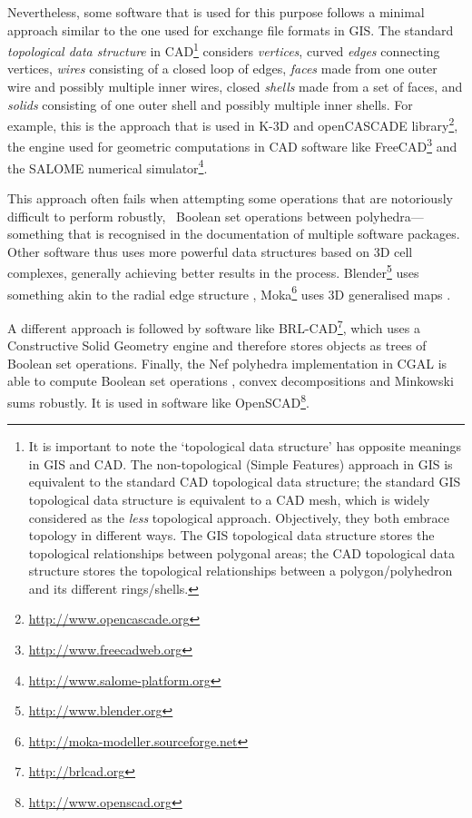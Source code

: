 Nevertheless, some software that is used for this purpose follows a minimal approach similar to the one used for exchange file formats in GIS.\@
The standard \emph{topological data structure} in CAD\footnote{It is important to note the `topological data structure' has opposite meanings in GIS and CAD.\@
The non-topological (Simple Features) approach in GIS is equivalent to the standard CAD topological data structure; the standard GIS topological data structure is equivalent to a CAD mesh, which is widely considered as the \emph{less} topological approach. Objectively, they both embrace topology in different ways. The GIS topological data structure stores the topological relationships between polygonal areas; the CAD topological data structure stores the topological relationships between a polygon/polyhedron and its different rings/shells.} considers \emph{vertices}, curved \emph{edges} connecting vertices, \emph{wires} consisting of a closed loop of edges, \emph{faces} made from one outer wire and possibly multiple inner wires, closed \emph{shells} made from a set of faces, and \emph{solids} consisting of one outer shell and possibly multiple inner shells.
For example, this is the approach that is used in K-3D \citep{Shead10} and openCASCADE library\footnote{\url{http://www.opencascade.org}}, the engine used for geometric computations in CAD software like FreeCAD\footnote{\url{http://www.freecadweb.org}} and the SALOME numerical simulator\footnote{\url{http://www.salome-platform.org}}.

This approach often fails when attempting some operations that are notoriously difficult to perform robustly, \eg\ Boolean set operations between polyhedra---something that is recognised in the documentation of multiple software packages.
Other software thus uses more powerful data structures based on 3D cell complexes, generally achieving better results in the process.
Blender\footnote{\url{http://www.blender.org}} uses something akin to the radial edge structure \citep{Weiler88}, Moka\footnote{\url{http://moka-modeller.sourceforge.net}} uses 3D generalised maps \citep{Lienhardt94}.

A different approach is followed by software like BRL-CAD\footnote{\url{http://brlcad.org}}, which uses a Constructive Solid Geometry engine and therefore stores objects as trees of Boolean set operations.
Finally, the Nef polyhedra implementation in CGAL \citep{Hachenberger06} is able to compute Boolean set operations \citep{Granados03}, convex decompositions \citep{Chazelle84} and Minkowski sums robustly.
It is used in software like OpenSCAD\footnote{\url{http://www.openscad.org}}.

